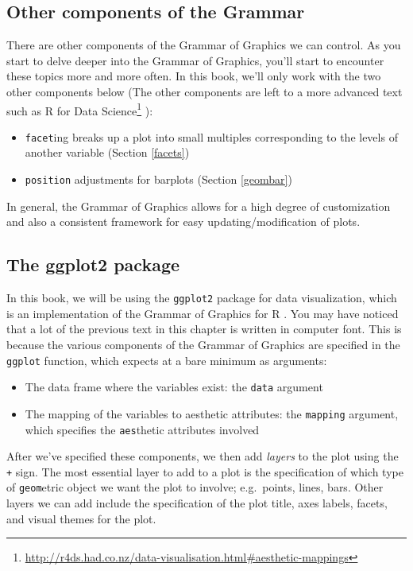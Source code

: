 \documentclass[12pt,]{krantz}
\providecommand{\tightlist}{%
  \setlength{\itemsep}{0pt}\setlength{\parskip}{0pt}}
\renewcommand{\href}[2]{#2\footnote{\url{#1}}}
\theoremstyle{definition}
\theoremstyle{definition}
\theoremstyle{definition}
\theoremstyle{remark}
\begin{document}
\subsection{Other components of the
Grammar}\label{other-components-of-the-grammar}

There are other components of the Grammar of Graphics we can control. As
you start to delve deeper into the Grammar of Graphics, you'll start to
encounter these topics more and more often. In this book, we'll only
work with the two other components below (The other components are left
to a more advanced text such as
\href{http://r4ds.had.co.nz/data-visualisation.html\#aesthetic-mappings}{R
for Data Science} \citep{rds2016}):

\begin{itemize}
\tightlist
\item
  \texttt{facet}ing breaks up a plot into small multiples corresponding
  to the levels of another variable (Section \ref{facets})
\item
  \texttt{position} adjustments for barplots (Section \ref{geombar}) 
\end{itemize}

In general, the Grammar of Graphics allows for a high degree of
customization and also a consistent framework for easy
updating/modification of plots.

\subsection{The ggplot2 package}\label{the-ggplot2-package}

In this book, we will be using the \texttt{ggplot2} package for data
visualization, which is an implementation of the Grammar of Graphics for
R \citep{R-ggplot2}. You may have noticed that a lot of the previous
text in this chapter is written in computer font. This is because the
various components of the Grammar of Graphics are specified in the
\texttt{ggplot} function, which expects at a bare minimum as arguments:

\begin{itemize}
\tightlist
\item
  The data frame where the variables exist: the \texttt{data} argument
\item
  The mapping of the variables to aesthetic attributes: the
  \texttt{mapping} argument, which specifies the \texttt{aes}thetic
  attributes involved
\end{itemize}

After we've specified these components, we then add \emph{layers} to the
plot using the \texttt{+} sign. The most essential layer to add to a
plot is the specification of which type of \texttt{geom}etric object we
want the plot to involve; e.g.~points, lines, bars. Other layers we can
add include the specification of the plot title, axes labels, facets,
and visual themes for the plot.
\end{document}
